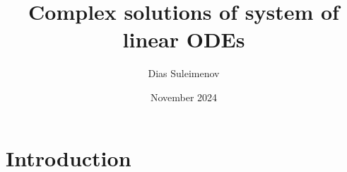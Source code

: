 \documentclass{article}
\title{Complex solutions of system of linear ODEs}
\author{Dias Suleimenov}
\date{November 2024}
\begin{document}
\maketitle

\section*{Introduction}
\end{document}
